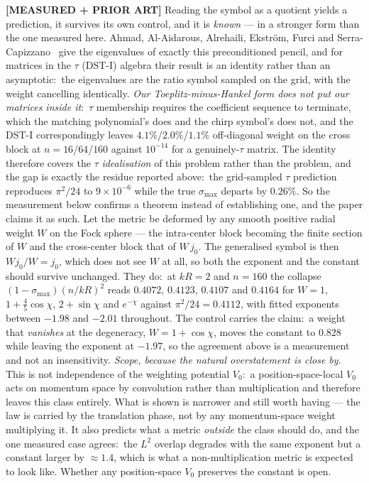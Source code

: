 \documentclass[aps,pra,twocolumn,superscriptaddress,longbibliography]{revtex4-2}
\newcommand{\gvq}[2]{#2}
\begin{document}
\textbf{[MEASURED + PRIOR ART]} Reading the symbol as a quotient yields a
prediction, it survives its own control, and it is \emph{known} --- in a
stronger form than the one measured here.  Ahmad, Al-Aidarous, Alrehaili,
Ekstr\"om, Furci and Serra-Capizzano~\cite{ahmad2018} give the eigenvalues of
exactly this preconditioned pencil, and for matrices in the $\tau$ (DST-I)
algebra their result is an identity rather than an asymptotic:\ the
eigenvalues are the ratio symbol sampled on the grid, with the weight
cancelling identically.  \emph{Our Toeplitz-minus-Hankel form does not put our
matrices inside it}:\ $\tau$ membership requires the coefficient sequence to
terminate, which the matching polynomial's does and the chirp symbol's does not,
and the DST-I correspondingly leaves $4.1\%$/$2.0\%$/$1.1\%$ off-diagonal
weight on the cross block at $n=16$/$64$/$160$ against $10^{-14}$ for a
genuinely-$\tau$ matrix.  The identity therefore covers the $\tau$
\emph{idealisation} of this problem rather than the problem, and the gap is
exactly the residue reported above:\ the grid-sampled $\tau$ prediction
reproduces $\pi^2/24$ to $9\times10^{-6}$ while the true $\sigma_{\max}$
departs by $0.26\%$.  So the measurement below confirms a theorem instead of
establishing one, and the paper claims it as such.  Let the metric be deformed
by any smooth positive
radial weight $W$ on the Fock sphere --- the intra-center block becoming the
finite section of $W$ and the cross-center block that of $W\,j_0$.  The
generalised symbol is then $W j_0/W=j_0$, which does not see $W$ at all, so
both the exponent and the constant should survive unchanged.  They do:\ at
$kR=2$ and $n=160$ the collapse $(1-\sigma_{\max})(n/kR)^2$ reads $0.4072$,
$0.4123$, $0.4107$ and $0.4164$ for $W=1$, $1+\tfrac45\cos\chi$,
$2+\sin\chi$ and $e^{-\chi}$ against $\pi^2/24=0.4112$, with fitted exponents
between $-1.98$ and $-2.01$ throughout.  The control carries the claim:\ a
weight that \emph{vanishes} at the degeneracy, $W=1+\cos\chi$, moves the
constant to $\gvq{p60_weighted_collapse_control}{0.828}$ while leaving the exponent at $-1.97$, so the agreement
above is a measurement and not an insensitivity.  \emph{Scope, because the
natural overstatement is close by.}  This is not independence of the weighting
potential $V_0$:\ a position-space-local $V_0$ acts on momentum space by
convolution rather than multiplication and therefore leaves this class
entirely.  What is shown is narrower and still worth having --- the law is
carried by the translation phase, not by any momentum-space weight multiplying
it.  It also predicts what a metric \emph{outside} the class should do, and the
one measured case agrees:\ the $L^2$ overlap degrades with the same exponent
but a constant larger by $\approx\!1.4$, which is what a non-multiplication
metric is expected to look like.  Whether any position-space $V_0$ preserves
the constant is open.
\end{document}
